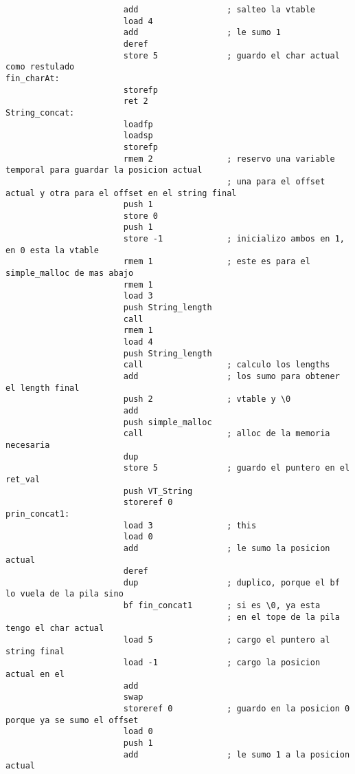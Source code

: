\documentclass [a4paper,abstracton,titlepage]{scrartcl}
\begin{document}
\begin{lstlisting}
                        add                  ; salteo la vtable
                        load 4
                        add                  ; le sumo 1
                        deref
                        store 5              ; guardo el char actual como restulado
fin_charAt:            
                        storefp
                        ret 2
String_concat:         
                        loadfp
                        loadsp
                        storefp
                        rmem 2               ; reservo una variable temporal para guardar la posicion actual
                                             ; una para el offset actual y otra para el offset en el string final
                        push 1
                        store 0
                        push 1
                        store -1             ; inicializo ambos en 1, en 0 esta la vtable
                        rmem 1               ; este es para el simple_malloc de mas abajo
                        rmem 1
                        load 3
                        push String_length
                        call
                        rmem 1
                        load 4
                        push String_length
                        call                 ; calculo los lengths
                        add                  ; los sumo para obtener el length final
                        push 2               ; vtable y \0
                        add
                        push simple_malloc
                        call                 ; alloc de la memoria necesaria
                        dup
                        store 5              ; guardo el puntero en el ret_val
                        push VT_String
                        storeref 0
prin_concat1:          
                        load 3               ; this
                        load 0
                        add                  ; le sumo la posicion actual
                        deref
                        dup                  ; duplico, porque el bf lo vuela de la pila sino
                        bf fin_concat1       ; si es \0, ya esta
                                             ; en el tope de la pila tengo el char actual
                        load 5               ; cargo el puntero al string final
                        load -1              ; cargo la posicion actual en el
                        add
                        swap
                        storeref 0           ; guardo en la posicion 0 porque ya se sumo el offset
                        load 0
                        push 1
                        add                  ; le sumo 1 a la posicion actual

\end{lstlisting}
\end{document}
